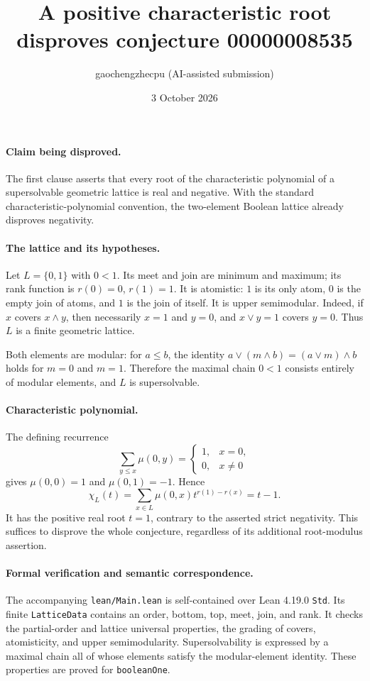 \documentclass[10pt]{article}
\title{A positive characteristic root disproves conjecture 00000008535}
\author{gaochengzhecpu (AI-assisted submission)}
\date{3 October 2026}
\makeatletter
\renewcommand{\maketitle}{\begin{center}
{\Large\bfseries\@title\par}\vspace{0.6em}
{\small\@author\par\@date}
\end{center}\vspace{0.5em}}
\makeatother
\begin{document}
\maketitle
\paragraph{Claim being disproved.}
The first clause asserts that every root of the characteristic polynomial of a supersolvable geometric lattice is real and negative. With the standard characteristic-polynomial convention, the two-element Boolean lattice already disproves negativity.
\paragraph{The lattice and its hypotheses.}
Let $L=\{0,1\}$ with $0<1$. Its meet and join are minimum and maximum; its rank function is $r(0)=0$, $r(1)=1$. It is atomistic: $1$ is its only atom, $0$ is the empty join of atoms, and $1$ is the join of itself. It is upper semimodular. Indeed, if $x$ covers $x\wedge y$, then necessarily $x=1$ and $y=0$, and $x\vee y=1$ covers $y=0$. Thus $L$ is a finite geometric lattice.

Both elements are modular: for $a\le b$, the identity $a\vee(m\wedge b)=(a\vee m)\wedge b$ holds for $m=0$ and $m=1$. Therefore the maximal chain $0<1$ consists entirely of modular elements, and $L$ is supersolvable.
\paragraph{Characteristic polynomial.}
The defining recurrence
\[
 \sum_{y\le x}\mu(0,y)=\begin{cases}1,&x=0,\\0,&x\ne0\end{cases}
\]
gives $\mu(0,0)=1$ and $\mu(0,1)=-1$. Hence
\[
 \chi_L(t)=\sum_{x\in L}\mu(0,x)t^{r(1)-r(x)}=t-1.
\]
It has the positive real root $t=1$, contrary to the asserted strict negativity. This suffices to disprove the whole conjecture, regardless of its additional root-modulus assertion.
\paragraph{Formal verification and semantic correspondence.}
The accompanying \texttt{lean/Main.lean} is self-contained over Lean 4.19.0 \texttt{Std}. Its finite \texttt{LatticeData} contains an order, bottom, top, meet, join, and rank. It checks the partial-order and lattice universal properties, the grading of covers, atomisticity, and upper semimodularity. Supersolvability is expressed by a maximal chain all of whose elements satisfy the modular-element identity. These properties are proved for \texttt{booleanOne}.
\end{document}
